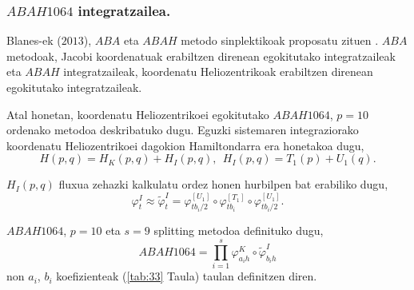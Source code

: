 \subsubsection*{$ABAH1064$ integratzailea.}

Blanes-ek ($2013$), $ABA$ eta $ABAH$ metodo sinplektikoak proposatu zituen \cite{Blanes2013}. $ABA$ metodoak, Jacobi koordenatuak erabiltzen direnean egokitutako integratzaileak eta $ABAH$ integratzaileak, koordenatu Heliozentrikoak erabiltzen direnean egokitutako integratzaileak.

Atal honetan, koordenatu Heliozentrikoei egokitutako $ABAH1064$, $p=10$ ordenako metodoa deskribatuko dugu.  
Eguzki sistemaren integraziorako koordenatu Heliozentrikoei dagokion Hamiltondarra era honetakoa dugu,
\begin{equation*}
H(p,q)=H_K(p,q)+H_I(p,q), \ \ H_I(p,q)=T_1(p)+U_1(q). 
\end{equation*}

$H_I(p,q)$ fluxua zehazki kalkulatu ordez honen hurbilpen bat erabiliko dugu,
\begin{equation*}
\varphi_t^I \approx \tilde{\varphi}_t^I= \varphi_{{tb_i}/{2}}^{[U_1]} \circ \varphi_{tb_i}^{[T_1]} \circ \varphi_{{tb_i}/{2}}^{[U_1]}.
\end{equation*}

$ABAH1064$, $p=10$ eta $s=9$ splitting metodoa definituko dugu,
\begin{equation*}
ABAH1064=\prod\limits_{i=1}^{s} \varphi_{a_ih}^K \circ \tilde{\varphi}_{b_ih}^I
\end{equation*}
non $a_i$, $b_i$ koefizienteak (\ref{tab:33} Taula) taulan definitzen diren.  

\begin{table}
\centering
\caption[$ABAH1064$ splitting metodoa.] 
{\small{$ABAH1064$ splitting metodoa \cite{Blanes2013}.}}
\label{tab:33}       %
\centering
{}
\end{table}


